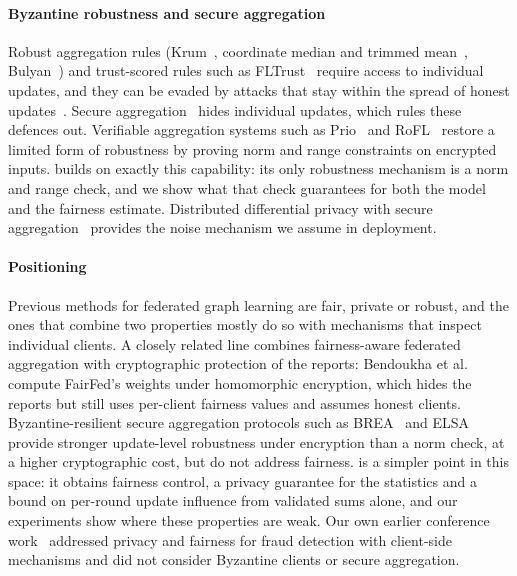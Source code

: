 \paragraph{Byzantine robustness and secure aggregation}
Robust aggregation rules (Krum~\citep{blanchard2017krum}, coordinate median and trimmed mean~\citep{yin2018byzantine}, Bulyan~\citep{mhamdi2018hidden}) and trust-scored rules such as FLTrust~\citep{cao2021fltrust} require access to individual updates, and they can be evaded by attacks that stay within the spread of honest updates~\citep{baruch2019little,xie2019fall}. Secure aggregation~\citep{bonawitz2017practical} hides individual updates, which rules these defences out. Verifiable aggregation systems such as Prio~\citep{corrigangibbs2017prio} and RoFL~\citep{lycklama2023rofl} restore a limited form of robustness by proving norm and range constraints on encrypted inputs. \clamp{} builds on exactly this capability: its only robustness mechanism is a norm and range check, and we show what that check guarantees for both the model and the fairness estimate. Distributed differential privacy with secure aggregation~\citep{kairouz2021distributed} provides the noise mechanism we assume in deployment.

\paragraph{Positioning}
Previous methods for federated graph learning are fair, private or robust, and the ones that combine two properties mostly do so with mechanisms that inspect individual clients. A closely related line combines fairness-aware federated aggregation with cryptographic protection of the reports: Bendoukha et al.~\citep{bendoukha2025popets} compute FairFed's weights under homomorphic encryption, which hides the reports but still uses per-client fairness values and assumes honest clients. Byzantine-resilient secure aggregation protocols such as BREA~\citep{so2021byzantine} and ELSA~\citep{rathee2023elsa} provide stronger update-level robustness under encryption than a norm check, at a higher cryptographic cost, but do not address fairness. \clamp{} is a simpler point in this space: it obtains fairness control, a privacy guarantee for the statistics and a bound on per-round update influence from validated sums alone, and our experiments show where these properties are weak. Our own earlier conference work~\citep{dang2026fedfairgnn} addressed privacy and fairness for fraud detection with client-side mechanisms and did not consider Byzantine clients or secure aggregation.
